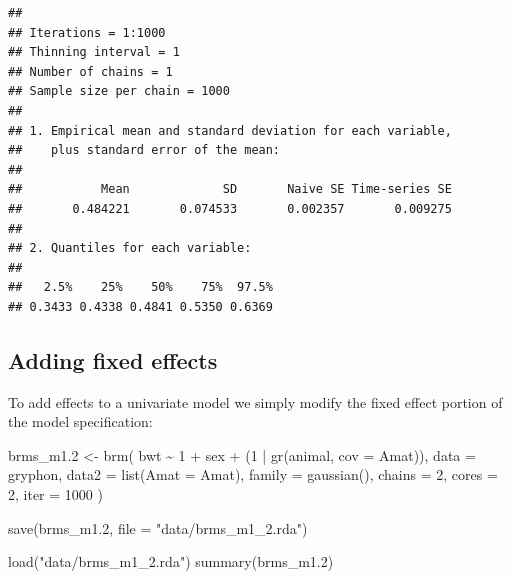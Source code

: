 \documentclass[
  12pt,
]{book}
\newenvironment{Shaded}{\begin{snugshade}}{\end{snugshade}}
\newcommand{\AttributeTok}[1]{\textcolor[rgb]{0.77,0.63,0.00}{#1}}
\newcommand{\DecValTok}[1]{\textcolor[rgb]{0.00,0.00,0.81}{#1}}
\newcommand{\FloatTok}[1]{\textcolor[rgb]{0.00,0.00,0.81}{#1}}
\newcommand{\FunctionTok}[1]{\textcolor[rgb]{0.00,0.00,0.00}{#1}}
\newcommand{\NormalTok}[1]{#1}
\newcommand{\OtherTok}[1]{\textcolor[rgb]{0.56,0.35,0.01}{#1}}
\newcommand{\SpecialCharTok}[1]{\textcolor[rgb]{0.00,0.00,0.00}{#1}}
\newcommand{\StringTok}[1]{\textcolor[rgb]{0.31,0.60,0.02}{#1}}
\begin{document}
\begin{verbatim}
## 
## Iterations = 1:1000
## Thinning interval = 1 
## Number of chains = 1 
## Sample size per chain = 1000 
## 
## 1. Empirical mean and standard deviation for each variable,
##    plus standard error of the mean:
## 
##           Mean             SD       Naive SE Time-series SE 
##       0.484221       0.074533       0.002357       0.009275 
## 
## 2. Quantiles for each variable:
## 
##   2.5%    25%    50%    75%  97.5% 
## 0.3433 0.4338 0.4841 0.5350 0.6369
\end{verbatim}

\hypertarget{adding-fixed-effects-2}{%
\subsection{Adding fixed effects}\label{adding-fixed-effects-2}}

To add effects to a univariate model we simply modify the fixed effect portion of the model specification:

\begin{Shaded}
\begin{Highlighting}[]
\NormalTok{brms\_m1}\FloatTok{.2} \OtherTok{\textless{}{-}} \FunctionTok{brm}\NormalTok{(}
\NormalTok{  bwt }\SpecialCharTok{\textasciitilde{}} \DecValTok{1} \SpecialCharTok{+}\NormalTok{ sex }\SpecialCharTok{+}\NormalTok{ (}\DecValTok{1} \SpecialCharTok{|} \FunctionTok{gr}\NormalTok{(animal, }\AttributeTok{cov =}\NormalTok{ Amat)),}
  \AttributeTok{data =}\NormalTok{ gryphon,}
  \AttributeTok{data2 =} \FunctionTok{list}\NormalTok{(}\AttributeTok{Amat =}\NormalTok{ Amat),}
  \AttributeTok{family =} \FunctionTok{gaussian}\NormalTok{(),}
  \AttributeTok{chains =} \DecValTok{2}\NormalTok{, }\AttributeTok{cores =} \DecValTok{2}\NormalTok{, }\AttributeTok{iter =} \DecValTok{1000}
\NormalTok{)}

\FunctionTok{save}\NormalTok{(brms\_m1}\FloatTok{.2}\NormalTok{, }\AttributeTok{file =} \StringTok{"data/brms\_m1\_2.rda"}\NormalTok{)}
\end{Highlighting}
\end{Shaded}

\begin{Shaded}
\begin{Highlighting}[]
\FunctionTok{load}\NormalTok{(}\StringTok{"data/brms\_m1\_2.rda"}\NormalTok{)}
\FunctionTok{summary}\NormalTok{(brms\_m1}\FloatTok{.2}\NormalTok{)}
\end{Highlighting}
\end{Shaded}
\end{document}
